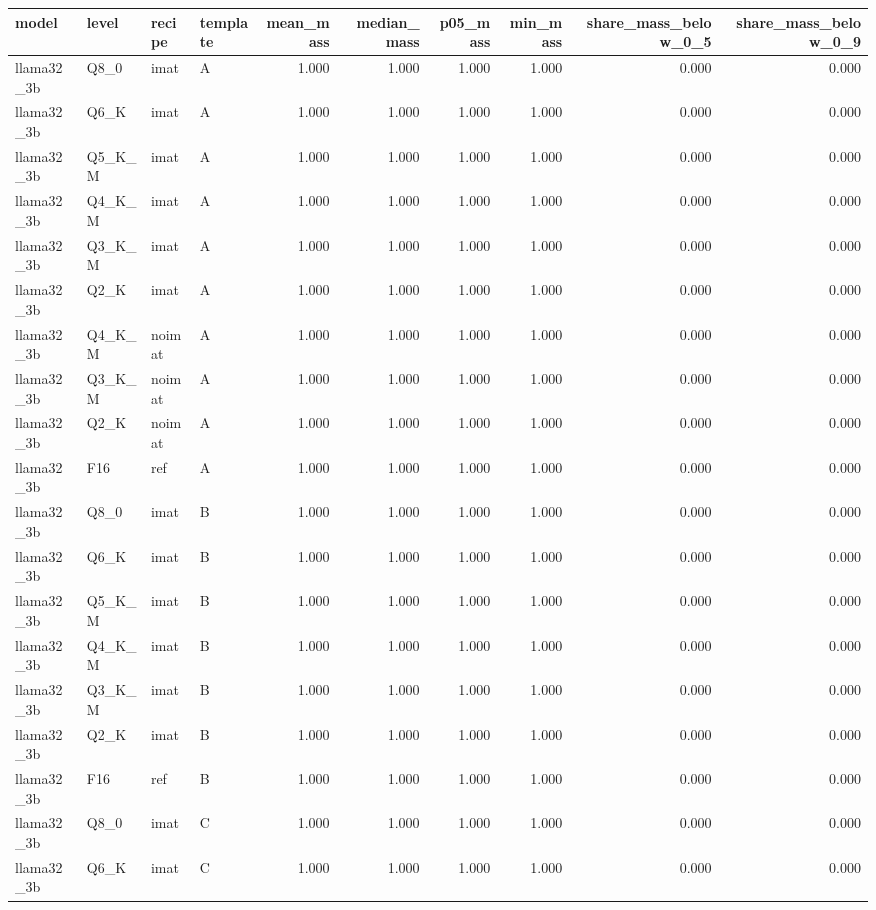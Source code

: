 \begin{tabular}{llllrrrrrr}
\toprule
model & level & recipe & template & mean\_mass & median\_mass & p05\_mass & min\_mass & share\_mass\_below\_0\_5 & share\_mass\_below\_0\_9 \\
\midrule
llama32\_3b & Q8\_0 & imat & A & 1.000 & 1.000 & 1.000 & 1.000 & 0.000 & 0.000 \\
llama32\_3b & Q6\_K & imat & A & 1.000 & 1.000 & 1.000 & 1.000 & 0.000 & 0.000 \\
llama32\_3b & Q5\_K\_M & imat & A & 1.000 & 1.000 & 1.000 & 1.000 & 0.000 & 0.000 \\
llama32\_3b & Q4\_K\_M & imat & A & 1.000 & 1.000 & 1.000 & 1.000 & 0.000 & 0.000 \\
llama32\_3b & Q3\_K\_M & imat & A & 1.000 & 1.000 & 1.000 & 1.000 & 0.000 & 0.000 \\
llama32\_3b & Q2\_K & imat & A & 1.000 & 1.000 & 1.000 & 1.000 & 0.000 & 0.000 \\
llama32\_3b & Q4\_K\_M & noimat & A & 1.000 & 1.000 & 1.000 & 1.000 & 0.000 & 0.000 \\
llama32\_3b & Q3\_K\_M & noimat & A & 1.000 & 1.000 & 1.000 & 1.000 & 0.000 & 0.000 \\
llama32\_3b & Q2\_K & noimat & A & 1.000 & 1.000 & 1.000 & 1.000 & 0.000 & 0.000 \\
llama32\_3b & F16 & ref & A & 1.000 & 1.000 & 1.000 & 1.000 & 0.000 & 0.000 \\
llama32\_3b & Q8\_0 & imat & B & 1.000 & 1.000 & 1.000 & 1.000 & 0.000 & 0.000 \\
llama32\_3b & Q6\_K & imat & B & 1.000 & 1.000 & 1.000 & 1.000 & 0.000 & 0.000 \\
llama32\_3b & Q5\_K\_M & imat & B & 1.000 & 1.000 & 1.000 & 1.000 & 0.000 & 0.000 \\
llama32\_3b & Q4\_K\_M & imat & B & 1.000 & 1.000 & 1.000 & 1.000 & 0.000 & 0.000 \\
llama32\_3b & Q3\_K\_M & imat & B & 1.000 & 1.000 & 1.000 & 1.000 & 0.000 & 0.000 \\
llama32\_3b & Q2\_K & imat & B & 1.000 & 1.000 & 1.000 & 1.000 & 0.000 & 0.000 \\
llama32\_3b & F16 & ref & B & 1.000 & 1.000 & 1.000 & 1.000 & 0.000 & 0.000 \\
llama32\_3b & Q8\_0 & imat & C & 1.000 & 1.000 & 1.000 & 1.000 & 0.000 & 0.000 \\
llama32\_3b & Q6\_K & imat & C & 1.000 & 1.000 & 1.000 & 1.000 & 0.000 & 0.000 \\

\end{tabular}

